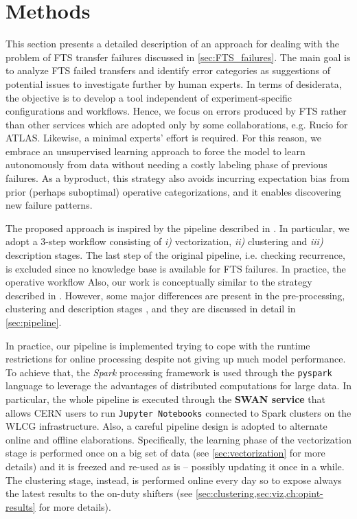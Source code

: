 \chapter{Methods}

This section presents a detailed description of an approach for dealing with the problem of FTS transfer failures discussed in \cref{sec:FTS_failures}.
The main goal is to analyze FTS failed transfers and identify error categories as suggestions of potential issues to investigate further by human experts.
In terms of desiderata, the objective is to develop a tool independent of experiment-specific configurations and workflows. Hence, we focus on errors produced by FTS rather than other services which are adopted only by some collaborations, e.g. Rucio for ATLAS.
Likewise, a minimal experts' effort is required. For this reason, we embrace an unsupervised learning approach to force the model to learn autonomously from data without needing a costly labeling phase of previous failures.
As a byproduct, this strategy also avoids incurring expectation bias from prior (perhaps suboptimal) operative categorizations, and it enables discovering new failure patterns.

The proposed approach \cite[Section 2.19]{opint2022} is inspired by the pipeline described in . %
In particular, we adopt a 3-step workflow consisting of \textit{i)} vectorization, \textit{ii)} clustering and \textit{iii)} description stages. 
The last step of the original pipeline, i.e. checking recurrence, is excluded since no knowledge base is available for FTS failures.
In practice, the operative workflow
Also, our work is conceptually similar to the strategy described in . However, some major differences are present in the pre-processing, clustering and description stages%
, and they are discussed in detail in \cref{sec:pipeline}.

In practice, our pipeline is implemented trying to cope with the runtime restrictions for online processing despite not giving up much model performance.
To achieve that, the \textit{Spark} \cite{zaharia2010spark} processing framework is used through the \texttt{pyspark} language to leverage the advantages of distributed computations for large data. In particular,
the whole pipeline is executed through the \textbf{SWAN service} \cite{piparo2018swan} that allows CERN users to run \texttt{Jupyter Notebooks} connected to Spark clusters on the WLCG infrastructure.
Also, a careful pipeline design is adopted to alternate online and offline elaborations.
Specifically, the learning phase of the vectorization stage is performed once on a big set of data (see \cref{sec:vectorization} for more details) and it is freezed and re-used as is -- possibly updating it once in a while.
The clustering stage, instead, is performed online every day so to expose always the latest results to the on-duty shifters (see %
\cref{sec:clustering,sec:viz,ch:opint-results}
for more details).
